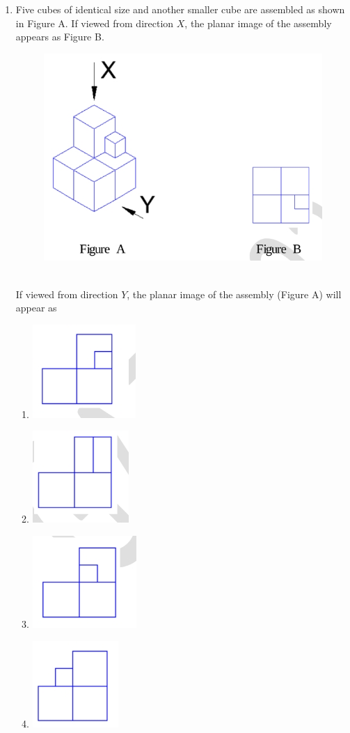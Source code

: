 \documentclass[journal,12pt,onecolumn]{IEEEtran}
\theoremstyle{remark}
\begin{document}
\begin{enumerate}
\item  Five cubes of identical size and another smaller cube are assembled as shown in Figure A. If viewed from direction $X$, the planar image of the assembly appears as Figure B.
\begin{figure}[h]
    \centering
    \includegraphics[width=0.5\columnwidth]{figs/im 3.jpeg}
    \caption{}
    \label{fig:placeholder}
\end{figure}\\
If viewed from direction $Y$, the planar image of the assembly (Figure A) will appear as
\begin{enumerate}
    \item  \includegraphics[width=0.2\linewidth]{figs/im 4 1.jpeg}
        
    \item 
        \includegraphics[width=0.2\linewidth]{figs/im 4 2.jpeg}
        
       
     \item 
        \includegraphics[width=0.2\linewidth]{figs/im 4 3.jpeg}
       
     \item
        \includegraphics[width=0.2\linewidth]{figs/im 4 4.jpeg}
      

\end{enumerate}
\end{enumerate}
\end{document}
